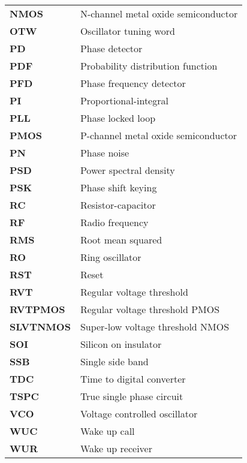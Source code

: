 	{\renewcommand*{\arraystretch}{1.00}\large
	\begin{tabular}{@{}ll}
		\textbf{\textsf{NMOS}}	&	N-channel metal oxide semiconductor \\
		\textbf{\textsf{OTW}}	&	Oscillator tuning word \\
		\textbf{\textsf{PD}}	&	Phase detector \\
		\textbf{\textsf{PDF}}	&	Probability distribution function \\
		\textbf{\textsf{PFD}}	&	Phase frequency detector \\
		\textbf{\textsf{PI}}	&	Proportional-integral \\
		\textbf{\textsf{PLL}}	&	Phase locked loop \\
		\textbf{\textsf{PMOS}}	&	P-channel metal oxide semiconductor \\
		\textbf{\textsf{PN}}	&	Phase noise \\
		\textbf{\textsf{PSD}}	&	Power spectral density \\
		\textbf{\textsf{PSK}}	&	Phase shift keying \\
		\textbf{\textsf{RC}}	&	Resistor-capacitor \\
		\textbf{\textsf{RF}}	&	Radio frequency \\
		\textbf{\textsf{RMS}}	&	Root mean squared \\
		\textbf{\textsf{RO}}	&	Ring oscillator \\
		\textbf{\textsf{RST}}	&	Reset \\
		\textbf{\textsf{RVT}}	&	Regular voltage threshold \\
		\textbf{\textsf{RVTPMOS}}	&	Regular voltage threshold PMOS \\
		\textbf{\textsf{SLVTNMOS}}	&	Super-low voltage threshold NMOS \\
		\textbf{\textsf{SOI}}	&	Silicon on insulator \\
		\textbf{\textsf{SSB}}	&	Single side band \\
		\textbf{\textsf{TDC}}	&	Time to digital converter \\
		\textbf{\textsf{TSPC}}	&	True single phase circuit \\
		\textbf{\textsf{VCO}}	&	Voltage controlled oscillator \\
		\textbf{\textsf{WUC}}	&	Wake up call \\
		\textbf{\textsf{WUR}}	&	Wake up receiver \\
	\end{tabular}}
